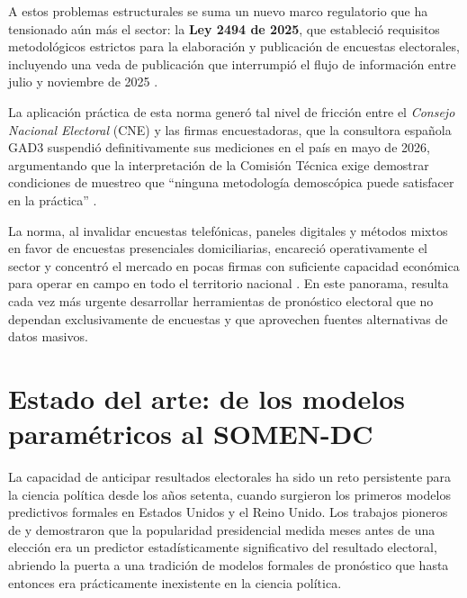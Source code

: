 A estos problemas estructurales se suma un nuevo marco regulatorio que ha tensionado aún más el sector: la \textbf{Ley 2494 de 2025}, que estableció requisitos metodológicos estrictos para la elaboración y publicación de encuestas electorales, incluyendo una veda de publicación que interrumpió el flujo de información entre julio y noviembre de 2025 \parencite{ley2494_2025}. 

La aplicación práctica de esta norma generó tal nivel de fricción entre el \textit{Consejo Nacional Electoral} (CNE) y las firmas encuestadoras, que la consultora española GAD3 suspendió definitivamente sus mediciones en el país en mayo de 2026, argumentando que la interpretación de la Comisión Técnica exige demostrar condiciones de muestreo que ``ninguna metodología demoscópica puede satisfacer en la práctica'' \parencite{gad3_2026}. 

La norma, al invalidar encuestas telefónicas, paneles digitales y métodos mixtos en favor de encuestas presenciales domiciliarias, encareció operativamente el sector y concentró el mercado en pocas firmas con suficiente capacidad económica para operar en campo en todo el territorio nacional \parencite{occidente2026}. En este panorama, resulta cada vez más urgente desarrollar herramientas de pronóstico electoral que no dependan exclusivamente de encuestas y que aprovechen fuentes alternativas de datos masivos.

\section{Estado del arte: de los modelos paramétricos al SOMEN-DC}

La capacidad de anticipar resultados electorales ha sido un reto persistente
para la ciencia política desde los años setenta, cuando surgieron los primeros
modelos predictivos formales en Estados Unidos y el Reino Unido. Los trabajos
pioneros de \textcite{sigelman1979} y \textcite{whiteley1979} demostraron que
la popularidad presidencial medida meses antes de una elección era un predictor
estadísticamente significativo del resultado electoral, abriendo la puerta a
una tradición de modelos formales de pronóstico que hasta entonces era
prácticamente inexistente en la ciencia política.

